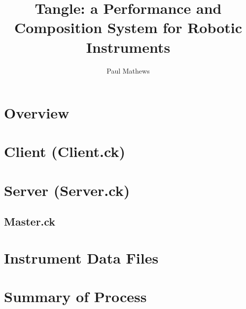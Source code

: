 \documentclass[11pt]{article}
\title{Tangle: a Performance and Composition System for Robotic Instruments}
\author{Paul Mathews}
\begin{document}
\maketitle

\section{Overview}


\section{Client (Client.ck)}


\section{Server (Server.ck)}

\subsection{Master.ck}


\section{Instrument Data Files}


\section{Summary of Process}

\end{document}
